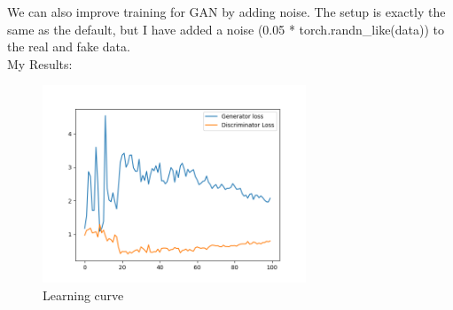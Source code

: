 \documentclass[a4paper]{article}
\theoremstyle{definition}
\newenvironment{soln}{
	\leavevmode\color{blue}\ignorespaces
}{}
\begin{document}
\begin{enumerate} [label=(\alph*)]
		\begin{soln} 
        We can also improve training for GAN by adding noise. The setup is exactly the same as the default, but I have added a noise (0.05 * torch.randn\_like(data)) to the real and fake data. \\
        My Results:
        \begin{figure}[H]
			\centering
			\includegraphics[width=0.7\textwidth]{images/q1c_loss.png}
			\caption{Learning curve}
			\label{fig:gan_q1_loss}
		\end{figure}
		

\end{soln}
\end{enumerate}
\end{document}
